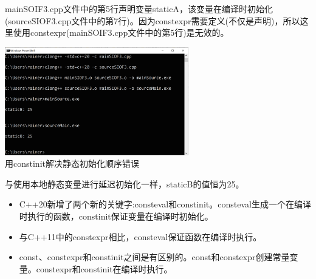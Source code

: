 mainSOIF3.cpp文件中的第5行声明变量staticA，该变量在编译时初始化(sourceSIOF3.cpp文件中的第7行)。因为constexpr需要定义(不仅是声明)，所以这里使用constexpr(mainSOIF3.cpp文件中的第5行)是无效的。

\begin{center}
\includegraphics[width=0.6\textwidth]{content/3/chapter4/images/39.png}\\
用constinit解决静态初始化顺序错误
\end{center}

与使用本地静态变量进行延迟初始化一样，staticB的值恒为25。

\begin{tcolorbox}[breakable,enhanced jigsaw,colback=mygreen!5!white,colframe=mygreen!75!black,title={总结}]
\begin{itemize}
\item 
C++20新增了两个新的关键字:consteval和constinit。consteval生成一个在编译时执行的函数，constinit保证变量在编译时初始化。

\item 
与C++11中的constexpr相比，consteval保证函数在编译时执行。

\item 
const、constexpr和constinit之间是有区别的。const和constexpr创建常量变量。constexpr和constinit在编译时执行。
\end{itemize}
\end{tcolorbox}	

\newpage





